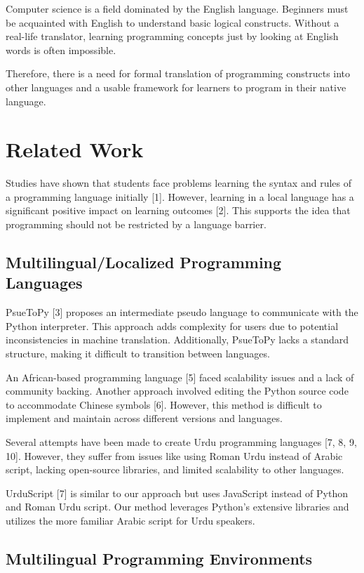\documentclass[conference]{IEEEtran}
\begin{document}
Computer science is a field dominated by the English language. Beginners must be acquainted with English to understand basic logical constructs. Without a real-life translator, learning programming concepts just by looking at English words is often impossible.

Therefore, there is a need for formal translation of programming constructs into other languages and a usable framework for learners to program in their native language.

\section{Related Work}

Studies have shown that students face problems learning the syntax and rules of a programming language initially [1]. However, learning in a local language has a significant positive impact on learning outcomes [2]. This supports the idea that programming should not be restricted by a language barrier.

\subsection{Multilingual/Localized Programming Languages}

PsueToPy [3] proposes an intermediate pseudo language to communicate with the Python interpreter. This approach adds complexity for users due to potential inconsistencies in machine translation. Additionally, PsueToPy lacks a standard structure, making it difficult to transition between languages. 

An African-based programming language [5] faced scalability issues and a lack of community backing. Another approach involved editing the Python source code to accommodate Chinese symbols [6]. However, this method is difficult to implement and maintain across different versions and languages.

Several attempts have been made to create Urdu programming languages [7, 8, 9, 10]. However, they suffer from issues like using Roman Urdu instead of Arabic script, lacking open-source libraries, and limited scalability to other languages.

UrduScript [7] is similar to our approach but uses JavaScript instead of Python and Roman Urdu script. Our method leverages Python's extensive libraries and utilizes the more familiar Arabic script for Urdu speakers.

\subsection{Multilingual Programming Environments}
\end{document}
